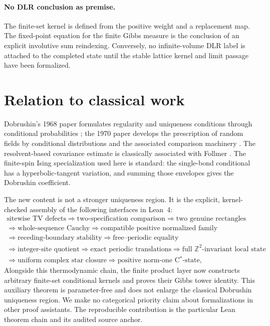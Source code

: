 \documentclass[11pt]{article}
\theoremstyle{definition}
\newcommand{\Z}{\mathbb Z}
\begin{document}
\paragraph{No DLR conclusion as premise.}
The finite-set kernel is defined from the positive weight and a replacement
map.  The fixed-point equation for the finite Gibbs measure is the conclusion
of an explicit involutive sum reindexing.  Conversely, no infinite-volume DLR
label is attached to the completed state until the stable lattice kernel and
limit passage have been formalized.

\section{Relation to classical work}

Dobrushin's 1968 paper formulates regularity and uniqueness conditions through
conditional probabilities \cite{Dobrushin1968}; the 1970 paper develops the
prescription of random fields by conditional distributions and the associated
comparison machinery \cite{Dobrushin1970}.  The resolvent-based covariance
estimate is classically associated with Follmer \cite{Follmer1982}.  The
finite-spin Ising specialization used here is standard: the single-bond
conditional has a hyperbolic-tangent variation, and summing those envelopes
gives the Dobrushin coefficient.

The new content is not a stronger uniqueness region.  It is the explicit,
kernel-checked assembly of the following interfaces in Lean~4:
\[
\begin{gathered}
\text{sitewise TV defects}
\Longrightarrow
\text{two-specification comparison}
\Longrightarrow
\text{two genuine rectangles}\\
\Longrightarrow
\text{whole-sequence Cauchy}
\Longrightarrow
\text{compatible positive normalized family}\\
\Longrightarrow
\text{receding-boundary stability}
\Longrightarrow
\text{free--periodic equality}\\
\Longrightarrow
\text{integer-site quotient}
\Longrightarrow
\text{exact periodic translations}
\Longrightarrow
\text{full $\Z^2$-invariant local state}\\
\Longrightarrow
\text{uniform complex star closure}
\Longrightarrow
\text{positive norm-one C$^*$-state},
\end{gathered}
\]
Alongside this thermodynamic chain, the finite product layer now constructs
arbitrary finite-set conditional kernels and proves their Gibbs tower
identity.  This auxiliary theorem is parameter-free and does not enlarge the
classical Dobrushin uniqueness region.
We make no categorical priority claim about formalizations in other proof
assistants.  The reproducible contribution is the particular Lean theorem
chain and its audited source anchor.
\end{document}
